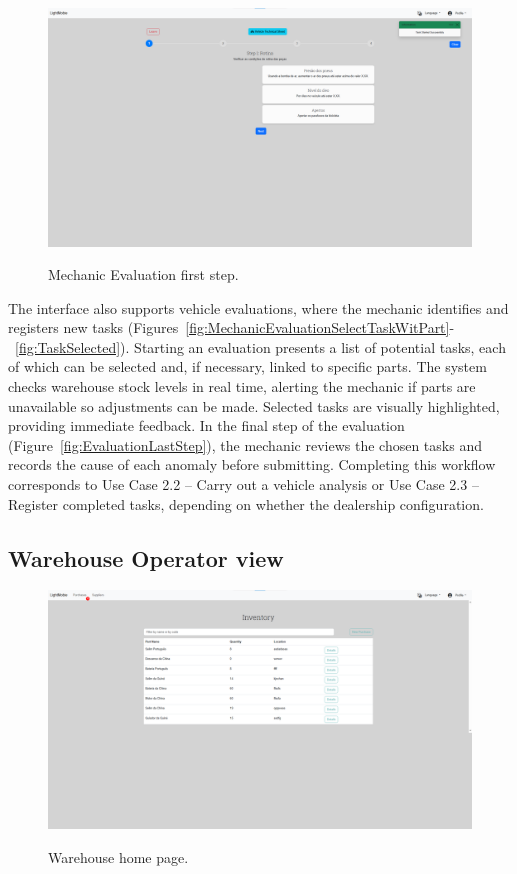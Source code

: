 \begin{figure}[h]
  \caption{Mechanic Evaluation first step.}
  \centering
  \includegraphics[width=\textwidth]{figs/Implementation/mechanic/MechanicEvaluationNormal}
  \label{fig:MechanicEvaluationNormal}
\end{figure}





The interface also supports vehicle evaluations, where the mechanic identifies and registers new tasks (Figures~\ref{fig:MechanicEvaluationSelectTaskWitPart}-~\ref{fig:TaskSelected}). Starting an evaluation presents a list of potential tasks, each of which can be selected and, if necessary, linked to specific parts. The system checks warehouse stock levels in real time, alerting the mechanic if parts are unavailable so adjustments can be made. Selected tasks are visually highlighted, providing immediate feedback. In the final step of the evaluation (Figure~\ref{fig:EvaluationLastStep}), the mechanic reviews the chosen tasks and records the cause of each anomaly before submitting. Completing this workflow corresponds to Use Case 2.2 – Carry out a vehicle analysis or Use Case 2.3 – Register completed tasks, depending on whether the dealership configuration.


\subsection{Warehouse Operator view}


\begin{figure}[h]
  \caption{Warehouse home page.}
  \centering
  \includegraphics[width=\textwidth]{figs/Implementation/warehouse/homepage}
  \label{fig:warehouseHomepage}
\end{figure}



